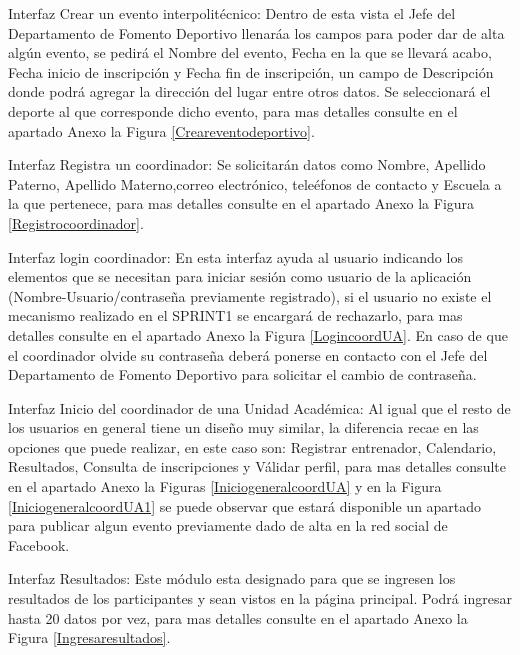 	\noindent Interfaz Crear un evento interpolitécnico: Dentro de esta vista el Jefe del Departamento de Fomento Deportivo llenaráa los campos para poder dar de alta algún evento, se pedirá el Nombre del evento, Fecha en la que se llevará acabo, Fecha inicio de inscripción y Fecha fin de inscripción, un campo de Descripción donde podrá agregar la dirección del lugar entre otros datos. Se seleccionará el deporte al que corresponde dicho evento, para mas detalles consulte en el apartado Anexo la Figura \ref{Creareventodeportivo}.
	\newline
	
	\noindent Interfaz Registra un coordinador: Se solicitarán datos como Nombre, Apellido Paterno, Apellido Materno,correo electrónico, teleéfonos de contacto y Escuela a la que pertenece, para mas detalles consulte en el apartado Anexo la Figura \ref{Registrocoordinador}.
	\pagebreak
	
	\noindent Interfaz login coordinador: En esta interfaz ayuda al usuario indicando los elementos que se necesitan para iniciar sesión como usuario de la aplicación (Nombre-Usuario/contraseña previamente registrado), si el usuario no existe el mecanismo realizado en el SPRINT1 se encargará de rechazarlo, para mas detalles consulte en el apartado Anexo la Figura \ref{LogincoordUA}. En caso de que el coordinador olvide su contraseña deberá ponerse en contacto con el Jefe del Departamento de Fomento Deportivo para solicitar el cambio de contraseña.
	\newline
	
	\noindent Interfaz  Inicio del coordinador de una Unidad Académica: Al igual que el resto de los usuarios en general tiene un diseño muy similar, la diferencia recae en las opciones que puede realizar, en este caso son: Registrar entrenador, Calendario, Resultados, Consulta de inscripciones y Válidar perfil, para mas detalles consulte en el apartado Anexo la Figuras 	\ref{IniciogeneralcoordUA} y en la Figura \ref{IniciogeneralcoordUA1} se puede observar que estará disponible un apartado para publicar algun evento previamente dado de alta en la red social de Facebook.
	\newline
	
	\noindent Interfaz Resultados: Este módulo esta designado para que se ingresen los resultados de los participantes y sean vistos en la página principal. Podrá ingresar hasta 20 datos por vez, para mas detalles consulte en el apartado Anexo la Figura \ref{Ingresaresultados}.
	\newline
	
